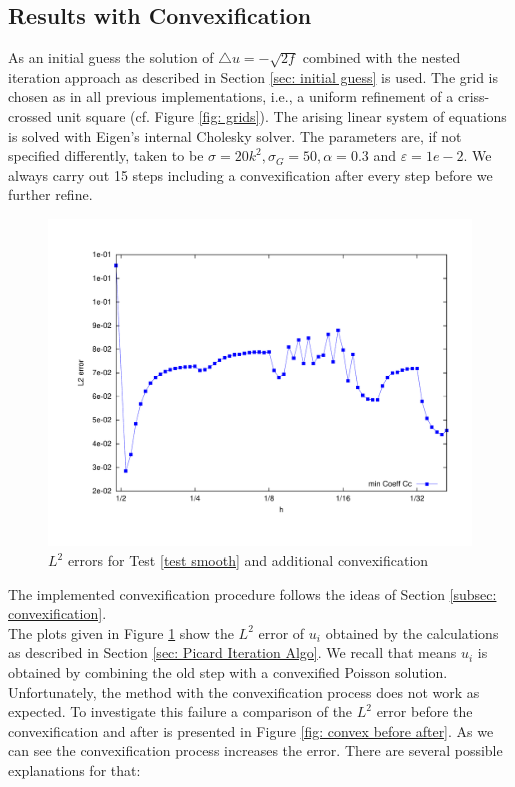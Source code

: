 \subsection{Results with Convexification}
As an initial guess the solution of $\triangle u = -\sqrt{2f}$ combined with the nested iteration approach as described in Section \ref{sec: initial guess} is used. The grid is chosen as in all previous implementations, i.e., a uniform refinement of a criss-crossed unit square (cf. Figure \ref{fig: grids}).
The arising linear system of equations is solved with Eigen's internal Cholesky solver.
The parameters are, if not specified differently, taken to be $\sigma=20 k^2, \sigma_G = 50, \alpha =
0.3$ and $\varepsilon = 1e-2$. We always carry out 15 steps including a convexification after every step before we further refine.
\begin{figure}[H]
\centering
	\includegraphics[scale =0.4]{plots/MA1_convexify.pdf}
	\caption{$L^2$ errors for Test \ref{test smooth} and additional convexification}
	\label{fig: l2 errors test smooth ourMethodConvex}
\end{figure}
The implemented convexification procedure follows the ideas of Section \ref{subsec: convexification}. \\
The plots given in Figure \ref{fig: l2 errors test smooth ourMethodConvex} show the $L^2$ error of $u_i$ obtained by the calculations as described in Section \ref{sec: Picard Iteration Algo}. We recall that means $u_i$ is obtained by combining the old step with a convexified Poisson solution. Unfortunately, the method with the convexification process does not work as expected.
To investigate this failure a comparison of the $L^2$ error before the convexification and after is presented in Figure \ref{fig: convex before after}. As we can see the convexification process increases the error. There are several possible explanations for that:

